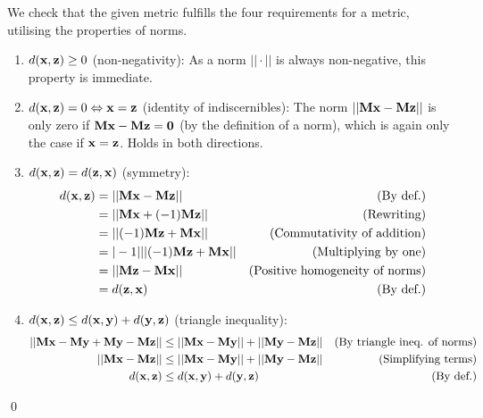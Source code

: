 We check that the given metric fulfills the four requirements for a
metric, utilising the properties of norms.

\begin{enumerate}
\item $d(\bold{x},\bold{z}) \geq 0$ (non-negativity): As a norm
  $||\cdot||$ is always non-negative, this property is immediate.
\item $d(\bold{x},\bold{z}) = 0 \Leftrightarrow \bold{x}=\bold{z}$ (identity of
  indiscernibles): The norm $||\bold{Mx}-\bold{Mz}||$ is only zero if
  $\bold{Mx}-\bold{Mz}=\bold{0}$ (by the definition of a norm), which
  is again only the case if $\bold{x}=\bold{z}$.  Holds in both
  directions.
\item $d(\bold{x},\bold{z}) = d(\bold{z},\bold{x})$ (symmetry):
  \begin{align*}
    d(\bold{x},\bold{z})&=||\bold{Mx}-\bold{Mz}||&\text{(By def.)} \\
    &=||\bold{Mx}+(-1)\bold{Mz}||&\text{(Rewriting)} \\
    &=||(-1)\bold{Mz}+\bold{Mx}||&\text{(Commutativity of addition)} \\
    &=|-1|||(-1)\bold{Mz}+\bold{Mx}||&\text{(Multiplying by one)} \\
    &=||\bold{Mz}-\bold{Mx}||&\text{(Positive homogeneity of norms)} \\
    &=d(\bold{z},\bold{x})&\text{(By def.)}
\end{align*}
\item $d(\bold{x}, \bold{z}) \leq d(\bold{x}, \bold{y}) + d(\bold{y},
  \bold{z})$ (triangle inequality):
  \begin{align*}
    ||\bold{Mx}-\bold{My}+\bold{My}-\bold{Mz}|| &\leq ||\bold{Mx}-\bold{My}|| + ||\bold{My}-\bold{Mz}||&\text{(By triangle ineq. of norms)}\\
    ||\bold{Mx}-\bold{Mz}|| &\leq ||\bold{Mx}-\bold{My}|| + ||\bold{My}-\bold{Mz}||&\text{(Simplifying terms)}\\
    d(\bold{x}, \bold{z}) &\leq d(\bold{x}, \bold{y}) + d(\bold{y}, \bold{z})&\text{(By def.)}
  \end{align*}
\end{enumerate}\qed